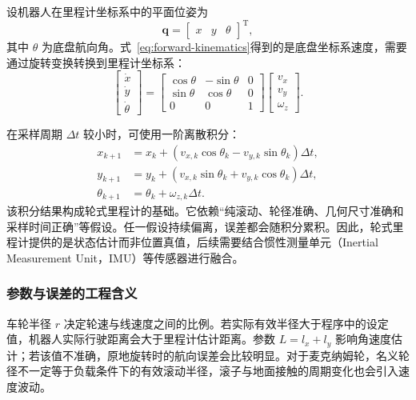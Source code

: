 \documentclass[UTF8,zihao=-4]{ctexart}
\newcommand{\vect}[1]{\bm{#1}}
\begin{document}
设机器人在里程计坐标系中的平面位姿为
\begin{equation}
  \vect{q}=
  \begin{bmatrix}
    x & y & \theta
  \end{bmatrix}^{\mathrm T},
\end{equation}
其中 $\theta$ 为底盘航向角。式~\eqref{eq:forward-kinematics}得到的是底盘坐标系速度，需要通过旋转变换转换到里程计坐标系：
\begin{equation}
  \begin{bmatrix}
    \dot{x}\\
    \dot{y}\\
    \dot{\theta}
  \end{bmatrix}
  =
  \begin{bmatrix}
    \cos\theta & -\sin\theta & 0\\
    \sin\theta &  \cos\theta & 0\\
    0           &  0           & 1
  \end{bmatrix}
  \begin{bmatrix}
    v_x\\
    v_y\\
    \omega_z
  \end{bmatrix}.
  \label{eq:world-velocity}
\end{equation}

在采样周期 $\Delta t$ 较小时，可使用一阶离散积分：
\begin{align}
  x_{k+1} &= x_k + (v_{x,k}\cos\theta_k-v_{y,k}\sin\theta_k)\Delta t,\\
  y_{k+1} &= y_k + (v_{x,k}\sin\theta_k+v_{y,k}\cos\theta_k)\Delta t,\\
  \theta_{k+1} &= \theta_k + \omega_{z,k}\Delta t.
  \label{eq:odometry-integration}
\end{align}
该积分结果构成轮式里程计的基础。它依赖“纯滚动、轮径准确、几何尺寸准确和采样时间正确”等假设。任一假设持续偏离，误差都会随积分累积。因此，轮式里程计提供的是状态估计而非位置真值，后续需要结合惯性测量单元（Inertial Measurement Unit，IMU）等传感器进行融合。

\subsubsection{参数与误差的工程含义}

车轮半径 $r$ 决定轮速与线速度之间的比例。若实际有效半径大于程序中的设定值，机器人实际行驶距离会大于里程计估计距离。参数 $L=l_x+l_y$ 影响角速度估计；若该值不准确，原地旋转时的航向误差会比较明显。对于麦克纳姆轮，名义轮径不一定等于负载条件下的有效滚动半径，滚子与地面接触的周期变化也会引入速度波动。
\end{document}
